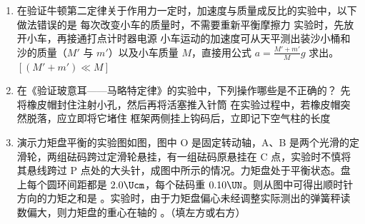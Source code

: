 \documentclass[\gkver]{gaokaozhenti}
\begin{document}
\begin{enumerate}
\item
在验证牛顿第二定律关于作用力一定时，加速度与质量成反比的实验中，以下做法错误的是
{每次改变小车的质量时，不需要重新平衡摩擦力}
{实验时，先放开小车，再接通打点计时器电源}
{小车运动的加速度可从天平测出装沙小桶和沙的质量（$M'$ 与 $m'$）以及小车质量 $M$，直接用公式 $a = \frac{M' + m'}{M}g$ 求出。$[(M' + m') \ll M]$}

\item
在《验证玻意耳——马略特定律》的实验中，下列操作哪些是不正确的？
{先将橡皮帽封住注射小孔，然后再将活塞推入针筒}
{在实验过程中，若橡皮帽突然脱落，应立即将它堵住}
{框架两侧挂上钩码后，立即记下空气柱的长度}

\item
演示力矩盘平衡的实验图如图，图中 O 是固定转动轴，A、B 是两个光滑的定滑轮，两组砝码跨过定滑轮悬挂，有一组砝码原悬挂在 C 点，实验时不慎将其悬线跨过 P 点处的大头针，成图中所示的情况。力矩盘处于平衡状态。盘上每个圆环间距都是 $2.0\Ucm$，每个砝码重 $0.10\UN$。则从图中可得出顺时针方向的力矩之和是 \tkanswer[2.4cm]{$0.04\UNcdotm$}。实验时，由于力矩盘偏心未经调整实际测出的弹簧秤读数偏大，则力矩盘的重心在轴的 。（填左方或右方）
\onepicture[align=right, w=4.97cm]{}


\end{enumerate}
\end{document}
